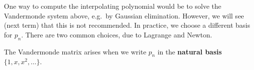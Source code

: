 \documentclass[
  letterpaper,
  DIV=11,
  numbers=noendperiod]{scrreprt}
\begin{document}
One way to compute the interpolating polynomial would be to solve the
Vandermonde system above, e.g.~by Gaussian elimination. However, we will
see (next term) that this is not recommended. In practice, we choose a
different basis for \(p_n\). There are two common choices, due to
Lagrange and Newton.

\begin{tcolorbox}[enhanced jigsaw, bottomtitle=1mm, title=\textcolor{quarto-callout-note-color}{\faInfo}\hspace{0.5em}{Note}, colback=white, opacityback=0, rightrule=.15mm, bottomrule=.15mm, colbacktitle=quarto-callout-note-color!10!white, colframe=quarto-callout-note-color-frame, arc=.35mm, breakable, coltitle=black, leftrule=.75mm, left=2mm, toptitle=1mm, toprule=.15mm, titlerule=0mm, opacitybacktitle=0.6]

The Vandermonde matrix arises when we write \(p_n\) in the
\textbf{natural basis} \(\{1,x,x^2,\ldots\}\).

\end{tcolorbox}
\end{document}

